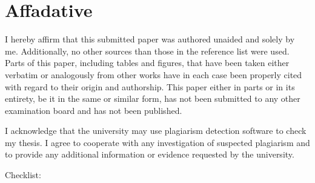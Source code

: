 \documentclass[
  man,
  floatsintext,
  longtable,
  nolmodern,
  notxfonts,
  notimes,
  colorlinks=true,linkcolor=blue,citecolor=blue,urlcolor=blue]{apa7}
\begin{document}
\newpage

\section{Affadative}\label{affadative}

I hereby affirm that this submitted paper was authored unaided and
solely by me. Additionally, no other sources than those in the reference
list were used. Parts of this paper, including tables and figures, that
have been taken either verbatim or analogously from other works have in
each case been properly cited with regard to their origin and
authorship. This paper either in parts or in its entirety, be it in the
same or similar form, has not been submitted to any other examination
board and has not been published.

I acknowledge that the university may use plagiarism detection software
to check my thesis. I agree to cooperate with any investigation of
suspected plagiarism and to provide any additional information or
evidence requested by the university.

Checklist:
\end{document}
